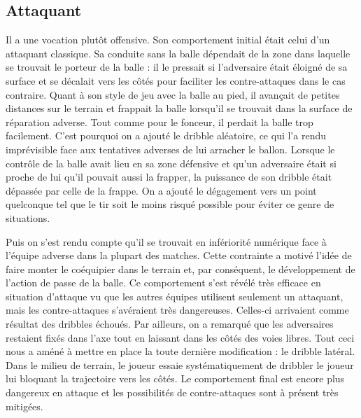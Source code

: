 \documentclass[12pt,a4paper]{article}
\begin{document}
\subsection*{Attaquant}
Il a une vocation plut\^ot offensive. Son comportement initial \'etait celui 
d'un attaquant classique. 
Sa conduite sans la balle d\'ependait de la zone dans laquelle se trouvait le 
porteur de la balle : il le pressait si l'adversaire \'etait \'eloign\'e de sa 
surface et se d\'ecalait vers les c\^ot\'es pour faciliter les contre-attaques 
dans le cas contraire. 
Quant \`a son style de jeu avec la balle au pied, il avan\c{c}ait de petites 
distances sur le terrain et frappait la balle lorsqu'il se trouvait dans la 
surface de r\'eparation adverse. Tout comme pour le fonceur, il perdait la balle 
trop facilement. 
C'est pourquoi on a ajout\'e le dribble al\'eatoire, ce qui l'a rendu 
impr\'evisible face aux tentatives adverses de lui arracher le ballon. 
Lorsque le contr\^ole de la balle avait lieu en sa zone d\'efensive et qu'un 
adversaire \'etait si proche de lui qu'il pouvait aussi la frapper, la 
puissance de son dribble \'etait d\'epass\'ee par celle de la frappe. On a 
ajout\'e le d\'egagement vers un point quelconque tel que le tir soit le moins 
risqu\'e possible pour \'eviter ce genre de situations.

Puis on s'est rendu compte qu'il se trouvait en inf\'eriorit\'e num\'erique face 
\`a l'\'equipe adverse dans la plupart des matches. Cette contrainte a motiv\'e 
l'id\'ee de faire monter le co\'equipier dans le terrain et, par cons\'equent, 
le d\'eveloppement de l'action de passe de la balle.
Ce comportement s'est r\'ev\'el\'e tr\`es efficace en situation d'attaque vu 
que les autres \'equipes utilisent seulement un attaquant, mais les 
contre-attaques s'av\'eraient tr\`es dangereuses. Celles-ci arrivaient comme 
r\'esultat des dribbles \'echou\'es. Par ailleurs, on a remarqu\'e que les 
adversaires restaient fix\'es dans l'axe tout en laissant dans les c\^ot\'es 
des voies libres. Tout ceci nous a am\'en\'e \`a mettre en place la toute 
derni\`ere modification : le dribble lat\'eral. Dans le milieu de terrain, le 
joueur essaie syst\'ematiquement de dribbler le joueur lui bloquant la 
trajectoire vers les c\^ot\'es. Le comportement final est encore plus 
dangereux en attaque et les possibilit\'es de contre-attaques sont \`a 
pr\'esent tr\`es mitig\'ees.
\end{document}

